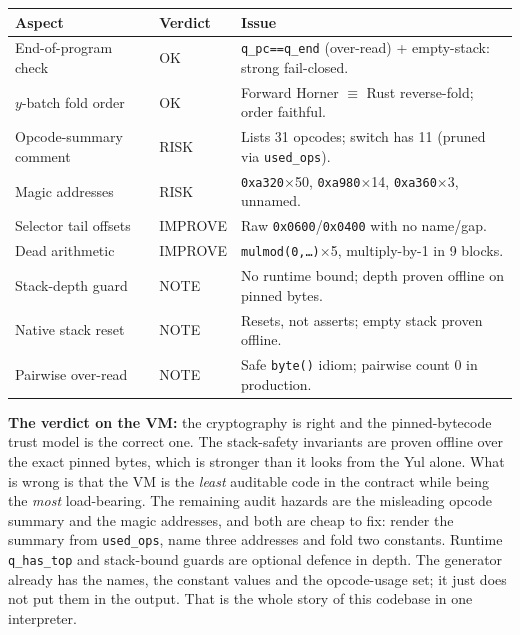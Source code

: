 \begin{center}
\small
\begin{tabular}{@{}p{}p{}p{}@{}}
\toprule
\textbf{Aspect} & \textbf{Verdict} & \textbf{Issue} \\
\midrule
End-of-program check & \textcolor{tracegreen}{OK} & \texttt{q\_pc==q\_end} (over-read) + empty-stack: strong fail-closed. \\
$y$-batch fold order & \textcolor{tracegreen}{OK} & Forward Horner $\equiv$ Rust reverse-fold; order faithful. \\
Opcode-summary comment & \textcolor{rustorange}{RISK} & Lists 31 opcodes; switch has 11 (pruned via \texttt{used\_ops}). \\
Magic addresses & \textcolor{rustorange}{RISK} & \texttt{0xa320}$\times$50, \texttt{0xa980}$\times$14, \texttt{0xa360}$\times$3, unnamed. \\
Selector tail offsets & \textcolor{codegenblue}{IMPROVE} & Raw \texttt{0x0600}/\texttt{0x0400} with no name/gap. \\
Dead arithmetic & \textcolor{codegenblue}{IMPROVE} & \texttt{mulmod(0,\ldots)}$\times$5, multiply-by-1 in 9 blocks. \\
Stack-depth guard & \textcolor{mathpurple}{NOTE} & No runtime bound; depth proven offline on pinned bytes. \\
Native stack reset & \textcolor{mathpurple}{NOTE} & Resets, not asserts; empty stack proven offline. \\
Pairwise over-read & \textcolor{mathpurple}{NOTE} & Safe \texttt{byte()} idiom; pairwise count 0 in production. \\
\bottomrule
\end{tabular}
\end{center}

\textbf{The verdict on the VM:} the cryptography is right and the
pinned-bytecode trust model is the correct one. The stack-safety
invariants are proven offline over the exact pinned bytes, which is
stronger than it looks from the Yul alone. What is wrong is that the
VM is the \emph{least} auditable code in the contract while being
the \emph{most} load-bearing. The remaining audit hazards are the
misleading opcode summary and the magic addresses, and both are
cheap to fix: render the summary from \texttt{used\_ops}, name three
addresses and fold two constants. Runtime \texttt{q\_has\_top} and
stack-bound guards are optional defence in depth. The generator
already has the names, the constant values and the opcode-usage
set; it just does not put them in the output. That is the whole
story of this codebase in one interpreter.

